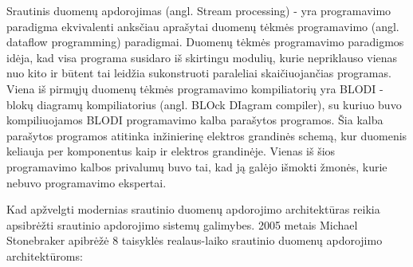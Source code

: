 \documentclass{VUMIFPSkursinis}
\begin{document}
    Srautinis duomenų apdorojimas (angl. Stream processing) - yra programavimo paradigma ekvivalenti anksčiau aprašytai duomenų tėkmės programavimo (angl. dataflow programming) paradigmai\cite{shortstreamproc}. 
Duomenų tėkmės programavimo paradigmos idėja, kad visa programa susidaro iš skirtingu modulių, kurie nepriklauso vienas nuo kito ir būtent tai leidžia sukonstruoti paraleliai skaičiuojančias programas. 
Viena iš pirmųjų duomenų tėkmės programavimo kompiliatorių yra BLODI - blokų diagramų kompiliatorius (angl. BLOck DIagram compiler), su kuriuo buvo kompiliuojamos BLODI programavimo kalba parašytos programos. 
Šia kalba parašytos programos atitinka inžinierinę elektros grandinės schemą, kur duomenis keliauja per komponentus kaip ir elektros grandinėje. Vienas iš šios programavimo kalbos privalumų buvo tai, 
kad ją galėjo išmokti žmonės, kurie nebuvo programavimo ekspertai\cite{kelly1961block}.\par
Kad apžvelgti modernias srautinio duomenų apdorojimo architektūras reikia apsibrėžti srautinio apdorojimo sistemų galimybes.
2005 metais Michael Stonebraker apibrėžė 8 taisyklės realaus-laiko srautinio duomenų apdorojimo architektūroms\cite{stonebraker20058}:
\end{document}
